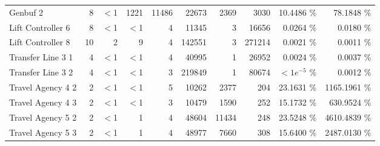 \begin{tabular}{|l|r|rrr|rrr|rr|}
  Genbuf 2 &   8 & $<$1 & 1221 & 11486 & 22673 & 2369 & 3030 & 10.4486 \% &   78.1848 \% \\ 
  Lift Controller 6 &   8 & $<$1 & $<$1 & 4 & 11345 & 3 & 16656 &  0.0264 \% &    0.0180 \% \\ 
  Lift Controller 8 &  10 & 2 & 9 & 4 & 142551 & 3 & 271214 &  0.0021 \% &    0.0011 \% \\ 
  Transfer Line 3 1 &   4 & $<$1 & $<$1 & 4 & 40995 & 1 & 26952 &  0.0024 \% &    0.0037 \% \\ 
  Transfer Line 3 2 &   4 & $<$1 & $<$1 & 3 & 219849 & 1 & 80674 & $<1e^{-5}$ \% &    0.0012 \% \\ 
  Travel Agency 4 2 &   2 & $<$1 & $<$1 & 5 & 10262 & 2377 & 204 & 23.1631 \% & 1165.1961 \% \\ 
  Travel Agency 4 3 &   2 & $<$1 & $<$1 & 3 & 10479 & 1590 & 252 & 15.1732 \% &  630.9524 \% \\ 
  Travel Agency 5 2 &   2 & $<$1 & 1 & 4 & 48604 & 11434 & 248 & 23.5248 \% & 4610.4839 \% \\ 
  Travel Agency 5 3 &   2 & $<$1 & 1 & 4 & 48977 & 7660 & 308 & 15.6400 \% & 2487.0130 \% \\ 
   \hline
\end{tabular}
